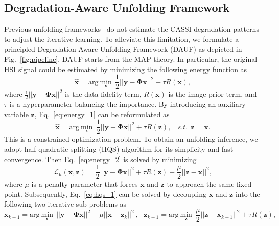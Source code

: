 \documentclass{article}
\begin{document}
\subsection{Degradation-Aware Unfolding Framework} \label{sec:dauf}
\vspace{-1mm}
Previous unfolding frameworks~\cite{dnu,hssp,gapnet,admm-net} do not estimate the CASSI degradation patterns to adjust the iterative learning.  To alleviate this limitation, we formulate a principled Degradation-Aware Unfolding Framework (DAUF) as depicted in Fig.~\ref{fig:pipeline}. DAUF starts from the MAP theory. In particular, the original HSI signal could be estimated by minimizing the following energy function as
\begin{equation}
\mathbf{\hat{x}} = \text{arg}~\underset{\mathbf{x}}{\text{min}}~~\frac{1}{2} || \mathbf{y} - \mathbf{\Phi} \mathbf{x} ||^2 + \tau R(\mathbf{x}), 
\label{eq:energy_1}
\end{equation}
where $\frac{1}{2} || \mathbf{y} - \mathbf{\Phi} \mathbf{x} ||^2$ is the data  fidelity term, $R(\mathbf{x})$ is the image prior term, and $\tau$ is a hyperparameter balancing the importance. By introducing an auxiliary variable $\mathbf{z}$, Eq.~\eqref{eq:energy_1} can be reformulated as 
\begin{equation}
\mathbf{\hat{x}} = \text{arg}~\underset{\mathbf{x}}{\text{min}}~~\frac{1}{2} || \mathbf{y} - \mathbf{\Phi} \mathbf{x} ||^2 + \tau R(\mathbf{z}), ~~~~ s.t.~~\mathbf{z} = \mathbf{x}.
\label{eq:energy_2}
\end{equation}
This is a constrained optimization problem. To obtain an unfolding inference, we adopt half-quadratic splitting (HQS) algorithm for its simplicity and fast convergence. Then Eq.~\eqref{eq:energy_2} is solved by minimizing 
\begin{equation}
\mathcal{L}_{\mu}(\mathbf{x}, \mathbf{z}) = \frac{1}{2} || \mathbf{y} - \mathbf{\Phi} \mathbf{x} ||^2 + \tau R(\mathbf{z}) + \frac{\mu}{2} || \mathbf{z} - \mathbf{x} ||^2,  
\label{eq:hqs_1}
\end{equation}
where $\mu$ is a penalty parameter that forces $\mathbf{x}$ and $\mathbf{z}$ to approach the same fixed point. Subsequently, Eq.~\eqref{eq:hqs_1} can be solved by decoupling $\mathbf{x}$ and $\mathbf{z}$  into the following two iterative sub-problems as
\begin{equation}
	\mathbf{x}_{k+1} = \text{arg}~\underset{\mathbf{x}}{\text{min}}~~|| \mathbf{y} - \mathbf{\Phi} \mathbf{x} ||^2 + \mu || \mathbf{x} - \mathbf{z}_{k} ||^2~,~~~\mathbf{z}_{k+1} = \text{arg}~\underset{\mathbf{z}}{\text{min}}~~\frac{\mu}{2} || \mathbf{z} - \mathbf{x}_{k+1} ||^2 +  \tau R(\mathbf{z}),
\label{eq:hqs_2}
\end{equation}
\end{document}
